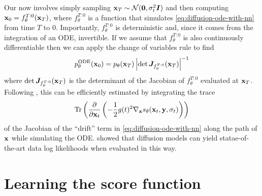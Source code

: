 Our now involves simply sampling ${\mathbf{x}}_T \sim {\mathcal{N}}({\bm{0}}, \sigma_t^2{\bm{I}})$ and then computing ${\mathbf{x}}_0 = f^{T:0}_\theta({\mathbf{x}}_T)$, where $f^{T:0}_\theta$ is a function that simulates \cref{eq:diffusion-ode-with-nn} from time $T$ to $0$. Importantly, $f^{T:0}_\theta$ is deterministic and, since it comes from the integration of an ODE, invertible. If we assume that $f^{T:0}_\theta$ is also continuously differentiable then we can apply the change of variables rule to find
\begin{equation}
    p_\theta^\text{ODE}({\mathbf{x}}_0) = p_\theta({\mathbf{x}}_T) \left| \det {\bm{J}}_{f^{T:0}_\theta}({\mathbf{x}}_T) \right|^{-1}
\end{equation}
where $\det {\bm{J}}_{f^{T:0}_\theta}({\mathbf{x}}_T)$ is the determinant of the Jacobian of $f^{T:0}_\theta$ evaluated at ${\mathbf{x}}_T$. Following \citet{chen2018neural}, this can be efficiently estimated by integrating the trace
\begin{equation}
    \text{Tr}\left( \frac{\partial}{\partial {\mathbf{x}}_t} \left( - \frac{1}{2} g(t)^2 \nabla_{\mathbf{x}} s_\theta({\mathbf{x}}_t, {\mathbf{y}}, \sigma_t) \right)
    \right)
\end{equation}
of the Jacobian of the ``drift'' term in \cref{eq:diffusion-ode-with-nn} along the path of ${\mathbf{x}}$ while simulating the ODE. \citet{song2020score} showed that diffusion models can yield statae-of-the-art data log likelihoods when evaluated in this way.




\section{Learning the score function} \label{sec:diffusion-training}

